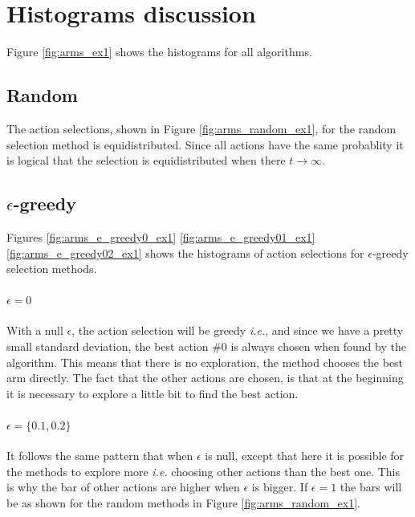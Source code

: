 \documentclass[letterpaper]{article}
\begin{document}
\section{Histograms discussion}

Figure \ref{fig:arms_ex1} shows the histograms for all algorithms.

\subsection*{Random}

The action selections, shown in Figure \ref{fig:arms_random_ex1},
for the random selection method is equidistributed.
Since all actions have the same probablity it is logical that the selection
is equidistributed when there $t \to \infty$.

\subsection*{$\epsilon$-greedy}


Figures \ref{fig:arms_e_greedy0_ex1}
\ref{fig:arms_e_greedy01_ex1}
\ref{fig:arms_e_greedy02_ex1} shows the histograms of action selections
for $\epsilon$-greedy selection methods.

\paragraph{$\epsilon = 0$}

With a null $\epsilon$, the action selection will be greedy \textit{i.e.},
and since we have a pretty small standard deviation, the best action \#0
is always chosen when found by the algorithm. This means that there is
no exploration, the method chooses the best arm directly. The fact that
the other actions are chosen, is that at the beginning it is necessary
to explore a little bit to find the best action.

\paragraph{$\epsilon = \{0.1, 0.2\}$}

It follows the same pattern that when $\epsilon$ is null, except that here
it is possible for the methods to explore more \textit{i.e.} choosing
other actions than the best one. This is why the bar of other actions
are higher when $\epsilon$ is bigger. If $\epsilon = 1$ the bars will
be as shown for the random methods in Figure \ref{fig:arms_random_ex1}.
\end{document}
